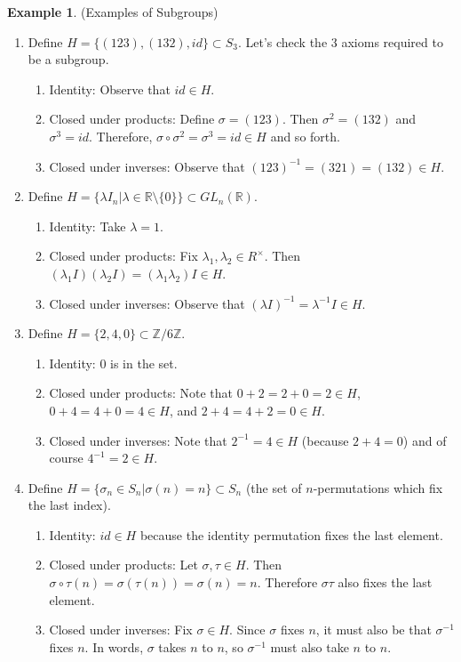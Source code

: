 \documentclass[12pt]{article}
\theoremstyle{definition}
\newtheorem{example}{\color{WildStrawberry}Example}
\theoremstyle{definition}
\begin{document}
\begin{example}(Examples of Subgroups)
\begin{enumerate}
	\item Define $H = \{ (1 2 3), (1 3 2), id \} \subset S_3$. Let's check the 3 axioms required to be a subgroup.
	\begin{enumerate}
		\item Identity: Observe that $id \in H$.
		\item Closed under products: Define $\sigma = (1 2 3)$. Then $\sigma^2 = (1 3 2)$ and $\sigma^3 = id$. Therefore, $\sigma \circ \sigma^2 = \sigma^3 = id \in H$ and so forth. 
		\item Closed under inverses: Observe that $(1 2 3)^{-1} = (3 2 1) = (1 3 2) \in H$. 
	\end{enumerate}
	\item Define $H = \{ \lambda I_n \vert \lambda \in \mathbb{R} \setminus \{0\} \} \subset GL_n(\mathbb{R})$.
	\begin{enumerate}
		\item Identity: Take $\lambda = 1$.
		\item Closed under products: Fix $\lambda_1, \lambda_2 \in R^{\times}$. Then $(\lambda_1 I)(\lambda_2 I) = (\lambda_1 \lambda_2) I \in H$.
		\item Closed under inverses: Observe that $(\lambda I)^{-1} = \lambda^{-1} I \in H$.
	\end{enumerate}
	\item Define $H = \{2, 4, 0 \} \subset \mathbb{Z} / 6 \mathbb{Z}$.
	\begin{enumerate}
		\item Identity: $0$ is in the set.
		\item Closed under products: Note that $0 + 2 = 2 + 0 = 2 \in H$, $0 + 4 = 4 + 0 = 4 \in H$, and $2 + 4 = 4 + 2 = 0 \in H$.
		\item Closed under inverses: Note that $2^{-1} = 4 \in H$ (because $2 + 4 = 0$) and of course $4^{-1} = 2 \in H$.
	\end{enumerate}
	\item Define $H = \{ \sigma_n \in S_n | \sigma(n) = n \} \subset S_n$ (the set of $n$-permutations which fix the last index).
	\begin{enumerate}
		\item Identity: $id \in H$ because the identity permutation fixes the last element.
		\item Closed under products: Let $\sigma, \tau \in H$. Then $\sigma \circ \tau (n) = \sigma(\tau(n)) = \sigma(n) = n$. Therefore $\sigma \tau$ also fixes the last element.
		\item Closed under inverses: Fix $\sigma \in H$. Since $\sigma$ fixes $n$, it must also be that $\sigma^{-1}$ fixes $n$. In words, $\sigma$ takes $n$ to $n$, so $\sigma^{-1}$ must also take $n$ to $n$.
	\end{enumerate}
\end{enumerate}
\end{example}
\end{document}
